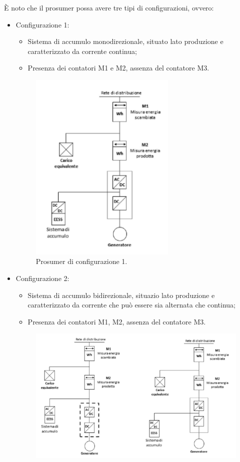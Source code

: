 È noto che il prosumer possa avere tre tipi di configurazioni, ovvero:
\begin{itemize}
    \item Configurazione 1:
          \begin{itemize}
              \item Sistema di accumulo monodirezionale, situato lato produzione e caratterizzato da corrente continua;
              \item Presenza dei contatori M1 e M2, assenza del contatore M3.
          \end{itemize}
          \begin{figure}[H]
              \centering
              \includegraphics[width=7cm]{images/config01.png}
              \caption{Prosumer di configurazione 1.}
              \label{fig:Prosumer_configurazione_1}
          \end{figure}
    \item Configurazione 2:
          \begin{itemize}
              \item Sistema di accumulo bidirezionale, situazio lato produzione e caratterizzato da corrente che può essere sia alternata che continua;
              \item Presenza dei contatori M1, M2, assenza del contatore M3.
          \end{itemize}
          \begin{figure}[H]
              \centering
              \includegraphics[width=11cm]{images/config02.png}

\end{figure}
\end{itemize}
